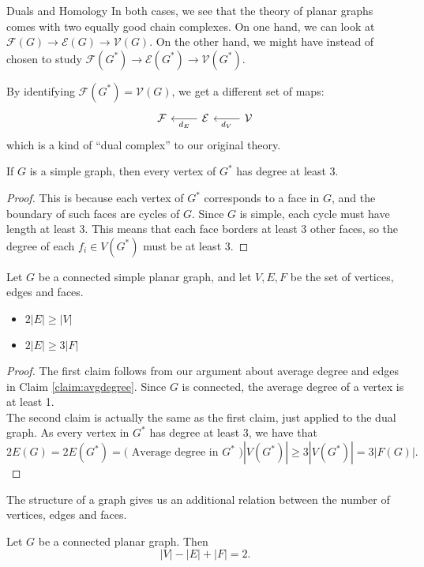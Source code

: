 \begin{projectdescription}{Duals and Homology}
  In both cases, we see that the theory of planar graphs comes with two equally good chain complexes. On one hand, we can look at $\mathcal F(G)\to \mathcal E(G)\to\mathcal V(G)$. On the other hand, we might have instead of chosen to study $\mathcal F(G^*)\to \mathcal E(G^* )\to \mathcal V(G^*)$.
\end{projectdescription}
 By identifying $\mathcal F(G^*)=\mathcal V(G)$, we get a different set of maps:
\[ \begin{tikzcd}
\mathcal F& \arrow{l}{d_E} \mathcal E& \arrow{l}{d_V}  \mathcal V
\end{tikzcd}\]
which is a kind of ``dual complex'' to our original theory. 
\begin{claim}
If $G$ is a simple graph, then every vertex of $G^*$ has degree at least 3.
\end{claim}
\begin{proof}
This is because each vertex of $G^*$ corresponds to a face in $G$, and the boundary of such faces are cycles of $G$. Since $G$ is simple, each cycle must have length at least 3. This means that each face borders at least 3 other faces, so the degree of each $f_i\in V(G^*)$ must be at least 3. 
\end{proof}
\begin{claim}
 Let $G$ be a connected simple planar graph, and let $V, E, F$ be the set of vertices, edges and faces. 
 \begin{itemize}
  \item $2|E|\geq |V|$
  \item $2|E|\geq 3|F|$
 \end{itemize}
\end{claim}
\begin{proof}
 The first claim follows from our argument about average degree and edges in Claim \ref{claim:avgdegree}. Since $G$ is connected, the average degree of a vertex is at least 1. \\
 The second claim is actually the same as the first claim, just applied to the dual graph. As every vertex in $G^*$ has degree at least 3, we have that 
 \[2E(G)=2E(G^*)=(\text{ Average degree in $G^*$ )}|V(G^*)|\geq 3|V(G^*)|= 3|F(G)|.\] 

\end{proof}
The structure of a graph gives us an additional relation between the number of vertices, edges and faces. 
\begin{theorem}
Let $G$ be a connected planar graph. Then
  \[|V|-|E|+|F|=2.\]
  \label{thm:eulersformula}
\end{theorem}
